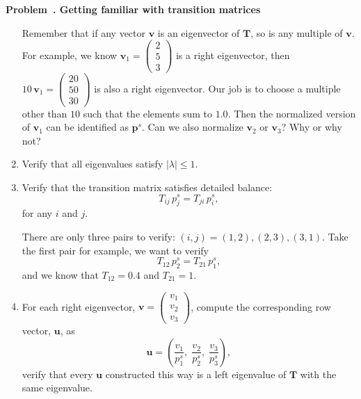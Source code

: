 \documentclass[12pt]{article}
\newcommand{\hint}[1]{{\color{dark-brown}\small #1}}
\newcounter{problem}[section]
\newenvironment{problem}[1]
{
  \refstepcounter{problem}\par\bigskip
  \textbf{\large Problem~\theproblem. #1}
  \par\medskip
}
{ \medskip }
\begin{document}
\begin{problem}{Getting familiar with transition matrices}
\begin{enumerate}
  \hint{
    Remember that if any vector $\mathbf v$
    is an eigenvector of $\mathbf T$,
    so is any multiple of $\mathbf v$.
    For example, we know
    $\mathbf v_1
    =
    \left(
      \begin{array}{c}
        2  \\
        5   \\
        3
      \end{array}
    \right)
    $
    is a right eigenvector, then
    $10 \, \mathbf v_1
    =
    \left(
      \begin{array}{c}
        20  \\
        50  \\
        30
      \end{array}
    \right)
    $
    is also a right eigenvector.
    Our job is to choose a multiple other than $10$
    such that the elements sum to $1.0$.
    Then the normalized version of $\mathbf v_1$
    can be identified as $\mathbf p^s$.
    Can we also normalize
    $\mathbf v_2$ or $\mathbf v_3$?
    Why or why not?
  }

  \item
  \label{prob1:eigneg1}
  Verify that all eigenvalues satisfy $|\lambda| \le 1$.

  \item
  Verify that the transition matrix satisfies detailed balance:
  $$
    T_{ij} \, p^s_j = T_{ji} \, p^s_i,
  $$
  for any $i$ and $j$.

  \hint{
    There are only three pairs to verify:
    $(i, j) = (1, 2), (2, 3), (3, 1)$.
    Take the first pair for example,
    we want to verify
    $$
    T_{12} \, p^s_2 = T_{21} \, p^s_1,
    $$
    and we know that $T_{12} = 0.4$
    and $T_{21} = 1$.
  }

  \item
    For each right eigenvector,
    $
    \mathbf v =
    \left(
      \begin{array}{c}
        v_1 \\
        v_2 \\
        v_3
      \end{array}
    \right)
    $,
  compute the corresponding row vector, $\mathbf u$,
  as
  \begin{equation}
    \mathbf u
    =
    \left(
      \frac { v_1 } { p^s_1 }
      , \;
      \frac { v_2 } { p^s_2 }
      , \;
      \frac { v_3 } { p^s_3 }
    \right)
    ,
    \label{eq:ufromv}
  \end{equation}
  verify that every $\mathbf u$
  constructed this way is a left eigenvalue of $\mathbf T$
  with the same eigenvalue.


\end{enumerate}
\end{problem}
\end{document}
